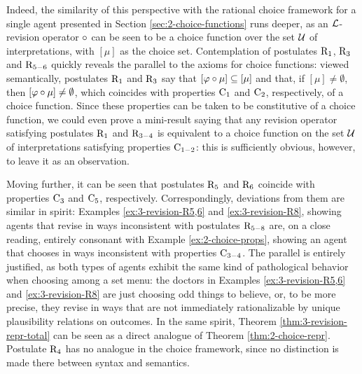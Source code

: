 Indeed, the similarity of this perspective with the rational choice framework for a single agent
presented in Section \ref{sec:2-choice-functions} runs deeper,
as an $\mathcal{L}$-revision operator $\circ$ can be seen to be a choice function
over the set $\mathcal{U}$ of interpretations, 
with $[\mu]$ as the choice set.
Contemplation of postulates $\mathrm{R}_{1}$, $\mathrm{R}_{3}$ and $\mathrm{R}_{5-6}$ quickly reveals 
the parallel to the axioms for choice functions:
viewed semantically, postulates $\mathrm{R}_{1}$ and $\mathrm{R}_{3}$ say that 
$[\varphi\circ\mu]\subseteq[\mu]$ and that, if $[\mu]\neq\emptyset$, 
then $[\varphi\circ\mu]\neq\emptyset$,
which coincides with properties $\mathrm{C}_{1}$ and $\mathrm{C}_{2}$, 
respectively, of a choice function.
Since these properties can be taken to be constitutive of a 
choice function, we could even prove a mini-result saying that any 
revision operator satisfying postulates $\mathrm{R}_{1}$ and $\mathrm{R}_{3-4}$
is equivalent to a choice function on the set $\mathcal{U}$ of interpretations
satisfying properties $\mathrm{C}_{1-2}$: this is sufficiently obvious, however,
to leave it as an observation.

Moving further, it can be seen that postulates $\mathrm{R}_{5}$ and $\mathrm{R}_{6}$ 
coincide with properties $\mathrm{C}_{3}$ and $\mathrm{C}_{5}$, respectively.
Correspondingly, deviations from them are similar in spirit:
Examples \ref{ex:3-revision-R5,6} and \ref{ex:3-revision-R8},
showing agents that revise in ways inconsistent with postulates $\mathrm{R}_{5-8}$
are, on a close reading, entirely consonant with Example \ref{ex:2-choice-props},
showing an agent that chooses in ways inconsistent with properties $\mathrm{C}_{3-4}$.
The parallel is entirely justified, as both types of agents exhibit 
the same kind of pathological behavior when choosing among a set menu:
the doctors in Examples \ref{ex:3-revision-R5,6} and \ref{ex:3-revision-R8} are just choosing 
odd things to believe, or, to be more precise, they revise in ways that are not 
immediately rationalizable by unique plausibility relations on outcomes.
In the same spirit, Theorem \ref{thm:3-revision-repr-total} can be seen 
as a direct analogue of Theorem \ref{thm:2-choice-repr}.
Postulate $\mathrm{R}_{4}$ has no analogue in the choice framework, since no distinction 
is made there between syntax and semantics.

